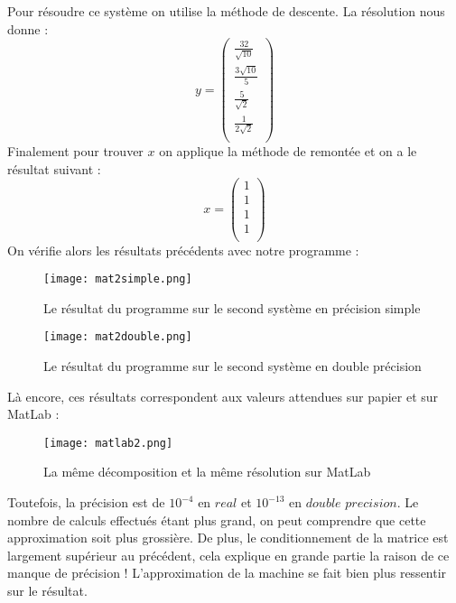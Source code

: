 \documentclass[a4paper, titlepage]{livret}													%
\begin{document}
		Pour résoudre ce système on utilise la méthode de descente.
		La résolution nous donne :
			\[
                    y =
                    \begin{pmatrix}
                        \frac{32}{\sqrt{10}} \\
                        \frac{3\sqrt{10}}{5} \\
                        \frac{5}{\sqrt{2}} \\
                        \frac{1}{2\sqrt{2}} \\
                    \end{pmatrix}
			\]
		Finalement pour trouver $x$ on applique la méthode de remontée et on a le résultat suivant :
			\[
                    x =
                    \begin{pmatrix}
                        1\\
                        1\\
                        1\\
                        1\\
                    \end{pmatrix}
			\]
		\newpage
		On vérifie alors les résultats précédents avec notre programme :

		\begin{figure}[!ht]
			\centering
  				\texttt{[image: mat2simple.png]}
  				\caption{Le résultat du programme sur le second système en précision simple}
		\end{figure}

		\begin{figure}[!ht]
			\centering
  				\texttt{[image: mat2double.png]}
  				\caption{Le résultat du programme sur le second système en double précision}
		\end{figure}
		\newpage
		Là encore, ces résultats correspondent aux valeurs attendues sur papier et sur MatLab :

		\begin{figure}[!ht]
			\centering
  				\texttt{[image: matlab2.png]}
  				\caption{La même décomposition et la même résolution sur MatLab}
		\end{figure}
		Toutefois, la précision est de $10^{-4}$ en $real$ et $10^{-13}$ en $double$ $precision$.
		Le nombre de calculs effectués étant plus grand, on peut comprendre que cette approximation soit plus grossière.
		De plus, le conditionnement de la matrice est largement supérieur au précédent, cela explique en grande partie la raison de ce manque de précision ! L'approximation de la machine se fait bien plus ressentir sur le résultat.
\end{document}
